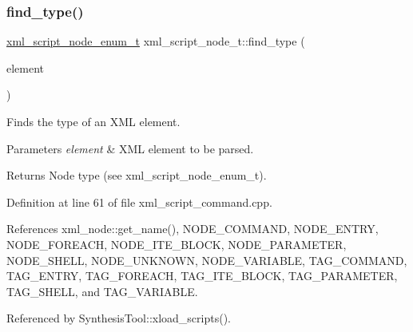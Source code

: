 \subsubsection{\texorpdfstring{find\+\_\+type()}{find\_type()}}
{\footnotesize\ttfamily \hyperlink{xml__script__command_8hpp_a3f764b80e60a34ae77719e7f4616a59b}{xml\+\_\+script\+\_\+node\+\_\+enum\+\_\+t} xml\+\_\+script\+\_\+node\+\_\+t\+::find\+\_\+type (\begin{DoxyParamCaption}\item[{const \hyperlink{classxml__element}{xml\+\_\+element} $\ast$}]{element }\end{DoxyParamCaption})\hspace{0.3cm}{\ttfamily [static]}}



Finds the type of an X\+ML element. 


\begin{DoxyParams}{Parameters}
{\em element} & X\+ML element to be parsed. \\
\hline
\end{DoxyParams}
\begin{DoxyReturn}{Returns}
Node type (see xml\+\_\+script\+\_\+node\+\_\+enum\+\_\+t). 
\end{DoxyReturn}


Definition at line 61 of file xml\+\_\+script\+\_\+command.\+cpp.



References xml\+\_\+node\+::get\+\_\+name(), N\+O\+D\+E\+\_\+\+C\+O\+M\+M\+A\+ND, N\+O\+D\+E\+\_\+\+E\+N\+T\+RY, N\+O\+D\+E\+\_\+\+F\+O\+R\+E\+A\+CH, N\+O\+D\+E\+\_\+\+I\+T\+E\+\_\+\+B\+L\+O\+CK, N\+O\+D\+E\+\_\+\+P\+A\+R\+A\+M\+E\+T\+ER, N\+O\+D\+E\+\_\+\+S\+H\+E\+LL, N\+O\+D\+E\+\_\+\+U\+N\+K\+N\+O\+WN, N\+O\+D\+E\+\_\+\+V\+A\+R\+I\+A\+B\+LE, T\+A\+G\+\_\+\+C\+O\+M\+M\+A\+ND, T\+A\+G\+\_\+\+E\+N\+T\+RY, T\+A\+G\+\_\+\+F\+O\+R\+E\+A\+CH, T\+A\+G\+\_\+\+I\+T\+E\+\_\+\+B\+L\+O\+CK, T\+A\+G\+\_\+\+P\+A\+R\+A\+M\+E\+T\+ER, T\+A\+G\+\_\+\+S\+H\+E\+LL, and T\+A\+G\+\_\+\+V\+A\+R\+I\+A\+B\+LE.



Referenced by Synthesis\+Tool\+::xload\+\_\+scripts().

